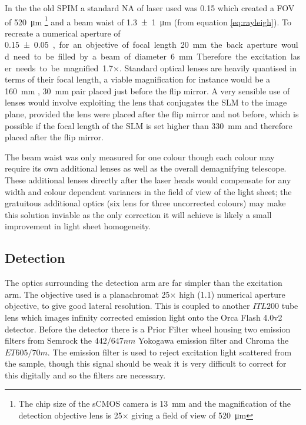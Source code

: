 In the the old SPIM a standard NA of laser used was 0.15 which created a FOV of \SI{520}{\micro\meter} \footnote{The chip size of the sCMOS camera is \SI{13}{\milli\meter} and the magnification of the detection objective lens is \SI{25}{}$\times$ giving a field of view of \SI{520}{\micro\meter}} and a beam waist of \SI{1.3 \pm 1}{\micro\meter} (from equation \ref{eq:rayleigh}).
To recreate a numerical aperture of \SI{0.15 \pm 0.05}, for an objective of focal length \SI{20}{\milli\meter}  the back aperture would need to be filled by a beam of diameter \SI{6}{\milli\meter}.
Therefore the excitation laser needs to be magnified \SI{1.7}{}$\times$.
Standard optical lenses are heavily quantised in terms of their focal length, a viable magnification for instance would be a \SI{160}{\milli\meter} , \SI{30}{\milli\meter} pair placed just before the flip mirror.
A very sensible use of lenses would involve exploiting the lens that conjugates the SLM to the image plane, provided the lens were placed after the flip mirror and not before, which is possible if the focal length of the SLM is set higher than \SI{330}{\milli\meter} and therefore placed after the flip mirror.

The beam waist was only measured for one colour though each colour may require its own additional lenses as well as the overall demagnifying telescope.
These additional lenses directly after the laser heads would compensate for any width and colour dependent variances in the field of view of the light sheet; the gratuitous additional optics (six lens for three uncorrected colours) may make this solution inviable as the only correction it will achieve is likely a small improvement in light sheet homogeneity.

\subsection{Detection}

The optics surrounding the detection arm are far simpler than the excitation arm.
The objective used is a planachromat \SI{25}{}$\times$ high (\SI{1.1}{}) numerical aperture objective, to give good lateral resolution.
This is coupled to another $ITL200$ tube lens which images infinity corrected emission light onto the Orca Flash 4.0v2 detector.
Before the detector there is a Prior Filter wheel housing two emission filters from Semrock the $442/647 nm$ Yokogawa emission filter and Chroma the $ET605/70m$.
The emission filter is used to reject excitation light scattered from the sample, though this signal should be weak it is very difficult to correct for this digitally and so the filters are necessary.

